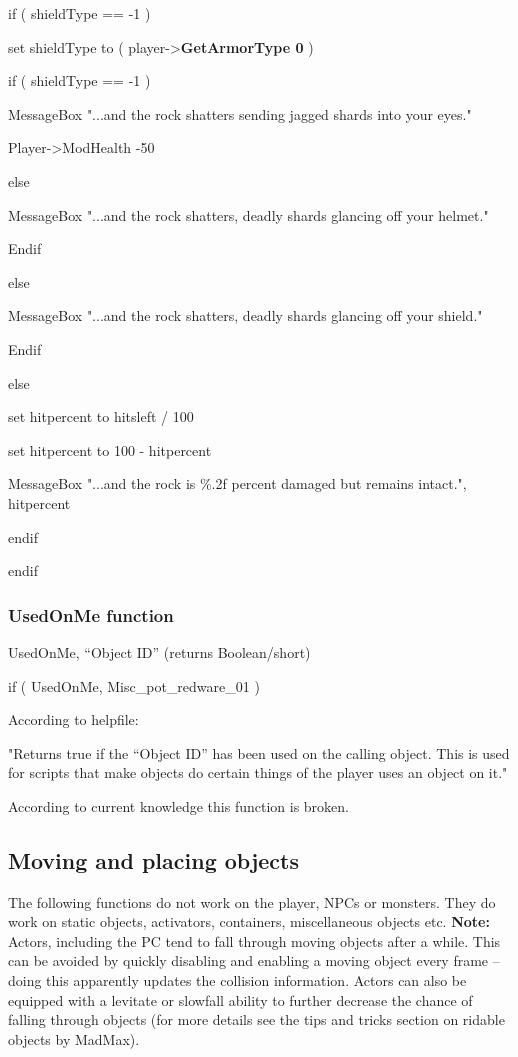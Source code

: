 \documentclass[
]{article}
\begin{document}
if ( shieldType == -1 )

set shieldType to ( player-\textgreater{}\textbf{GetArmorType 0} )

if ( shieldType == -1 )

MessageBox "...and the rock shatters sending jagged shards into your
eyes."

Player-\textgreater ModHealth -50

else

MessageBox "...and the rock shatters, deadly shards glancing off your
helmet."

Endif

else

MessageBox "...and the rock shatters, deadly shards glancing off your
shield."

Endif

else

set hitpercent to hitsleft / 100

set hitpercent to 100 - hitpercent

MessageBox "...and the rock is \%.2f percent damaged but remains
intact.", hitpercent

endif

endif

\hypertarget{usedonme-function}{%
\subsubsection{UsedOnMe function}\label{usedonme-function}}

UsedOnMe, ``Object ID'' (returns Boolean/short)

if ( UsedOnMe, Misc\_pot\_redware\_01 )

According to helpfile:

"Returns true if the ``Object ID'' has been used on the calling object.
This is used for scripts that make objects do certain things of the
player uses an object on it."

According to current knowledge this function is broken.

\hypertarget{moving-and-placing-objects}{%
\subsection{Moving and placing
objects}\label{moving-and-placing-objects}}

The following functions do not work on the player, NPCs or monsters.
They do work on static objects, activators, containers, miscellaneous
objects etc. \textbf{Note:} Actors, including the PC tend to fall
through moving objects after a while. This can be avoided by quickly
disabling and enabling a moving object every frame -- doing this
apparently updates the collision information. Actors can also be
equipped with a levitate or slowfall ability to further decrease the
chance of falling through objects (for more details see the tips and
tricks section on ridable objects by MadMax).
\end{document}
